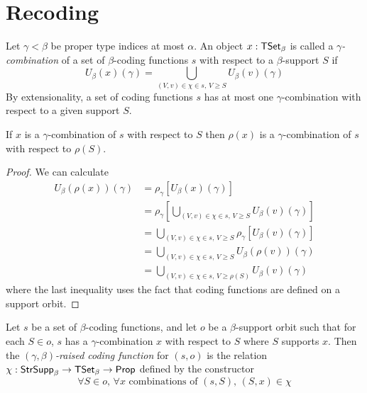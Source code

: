 \section{Recoding}
\begin{definition}
  \label{def:Combination}
  Let \( \gamma < \beta \) be proper type indices at most \( \alpha \).
  An object \( x : \mathsf{TSet}_\beta \) is called a \emph{\( \gamma \)-combination} of a set of \( \beta \)-coding functions \( s \) with respect to a \( \beta \)-support \( S \) if
  \[ U_\beta(x)(\gamma) = \bigcup_{(V, v) \in \chi \in s,\, V \geq S} U_\beta(v)(\gamma) \]
  By extensionality, a set of coding functions \( s \) has at most one \( \gamma \)-combination with respect to a given support \( S \).
\end{definition}
\begin{proposition}
  \label{prop:Combination.smul}
  If \( x \) is a \( \gamma \)-combination of \( s \) with respect to \( S \) then \( \rho(x) \) is a \( \gamma \)-combination of \( s \) with respect to \( \rho(S) \).
\end{proposition}
\begin{proof}
  We can calculate
  \begin{align*}
    U_\beta(\rho(x))(\gamma)
    &= \rho_\gamma[U_\beta(x)(\gamma)] \\
    &= \rho_\gamma\left[ \bigcup_{(V, v) \in \chi \in s,\, V \geq S} U_\beta(v)(\gamma) \right] \\
    &= \bigcup_{(V, v) \in \chi \in s,\, V \geq S} \rho_\gamma\left[ U_\beta(v)(\gamma) \right] \\
    &= \bigcup_{(V, v) \in \chi \in s,\, V \geq S} U_\beta(\rho(v))(\gamma) \\
    &= \bigcup_{(V, v) \in \chi \in s,\, V \geq \rho(S)} U_\beta(v)(\gamma)
  \end{align*}
  where the last inequality uses the fact that coding functions are defined on a support orbit.
\end{proof}
\begin{definition}
  \label{def:raisedCodingFunction}
  Let \( s \) be a set of \( \beta \)-coding functions, and let \( o \) be a \( \beta \)-support orbit such that for each \( S \in o \), \( s \) has a \( \gamma \)-combination \( x \) with respect to \( S \) where \( S \) supports \( x \).
  Then the \emph{\( (\gamma,\beta) \)-raised coding function} for \( (s, o) \) is the relation \( \chi : \mathsf{StrSupp}_\beta \to \mathsf{TSet}_\beta \to \mathsf{Prop} \) defined by the constructor
  \[ \forall S \in o,\, \forall x \text{ combinations of } (s, S),\, (S, x) \in \chi \]
\end{definition}
